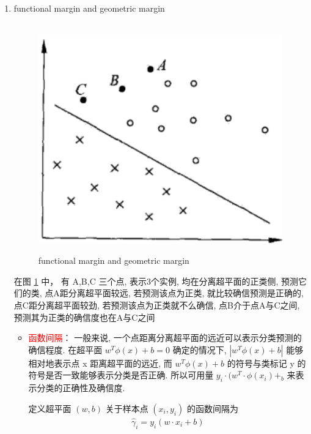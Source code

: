 \documentclass[oneside, 12pt]{ctexbook}
\begin{document}
\begin{enumerate}
					\item functional margin and geometric margin
						\begin{figure}[H]
							\label{margin}
							\vspace{-0.2cm}  %
							\setlength{\abovecaptionskip}{-0.2cm}   %
							\centering
							\includegraphics[scale=0.6]{functional_and_geometric_margin.png}
							\renewcommand{\figurename}{Fig} %
							\caption{functional margin and geometric margin}
						\end{figure}
						\qquad 在图 \ref{margin} 中， 有 A,B,C 三个点, 表示3个实例, 均在分离超平面的正类侧, 预测它们的类, 点A距分离超平面较远, 若预测该点为正类, 就比较确信预测是正确的, 点C距分离超平面较劲, 若预测该点为正类就不么确信, 点B介于点A与C之间, 预测其为正类的确信度也在A与C之间
						\begin{itemize}
							\item \textcolor{red}{函数间隔}： 一般来说, 一个点距离分离超平面的远近可以表示分类预测的确信程度. 在超平面 $w^T \phi(x) + b = 0$ 确定的情况下, $|w^T \phi(x) + b|$ 能够相对地表示点 x 距离超平面的远近, 而 $w^T \phi(x) + b$ 的符号与类标记 y 的符号是否一致能够表示分类是否正确. 所以可用量 $y_i \cdot (w^T \cdot \phi(x_i) +_b$ 来表示分类的正确性及确信度.
						
							定义超平面 $(w, b)$ 关于样本点 $(x_i, y_i)$ 的函数间隔为
								\begin{align}
									\hat{\gamma}_i = y_i (w \cdot x_i + b)
 								\end{align}
						

\end{itemize}
\end{enumerate}
\end{document}
